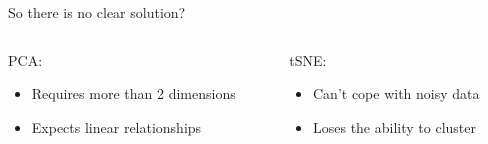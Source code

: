 \begin{frame}[allowframebreaks]{So there is no clear solution?}
    \begin{columns}
    \begin{column}{0.5\textwidth}
        PCA:
        \begin{itemize}
            \item Requires more than 2 dimensions
            \item Expects linear relationships
        \end{itemize}
    \end{column}
    \begin{column}{0.5\textwidth}
        tSNE:
        \begin{itemize}
            \item Can’t cope with noisy data
            \item Loses the ability to cluster
        \end{itemize}
    \end{column}
    \end{columns}

    \framebreak


\end{frame}
